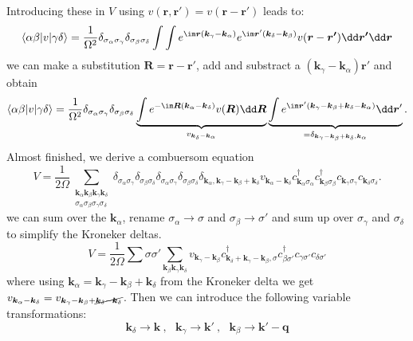 \documentclass[../main.tex]{subfile}
\begin{document}
Introducing these in $V$ using $v(\bm{r}, \bm{r'})= v(\bm{r} - \bm{r'})$ leads to:
\[
    \langle \alpha \beta |v|\gamma\delta\rangle = \frac{1}{\Omega^2} \delta_{\sigma_{\alpha}\sigma_{\gamma}}\delta_{\sigma_{\beta}\sigma_{\delta}} \int \int  e^{\im \bm{r}(\bm{k}_{\gamma}-\bm{k}_{\alpha})}  e^{\im \bm{r}'(\bm{k}_{\delta}-\bm{k}_{\beta})} v(\bm{r} - \bm{r'}) \dd \bm{r'} \dd \bm{r}
\]
we can make a substitution $\bm{R} = \bm{r} - \bm{r}'$, add and substract a $(\bm{k}_{\gamma}-\bm{k}_{\alpha})\bm{r}'$ and obtain
\[
    \langle \alpha \beta |v|\gamma\delta\rangle = \frac{1}{\Omega^2} \delta_{\sigma_{\alpha}\sigma_{\gamma}}\delta_{\sigma_{\beta}\sigma_{\delta}}
     \underbrace{\int e^{-\im\bm{R}(\bm{k}_{\alpha}- \bm{k}_{\delta})} v(\bm{R}) \dd \bm{R}}_{v_{\bm{k}_{\delta}- \bm{k}_{\alpha}}}
    \underbrace{\int e^{\im\bm{r}'\left(\bm{k}_{\gamma}-\bm{k}_{\beta} + \bm{k}_{\delta} -\bm{k}_{\alpha}\right)}\dd \bm{r}'}_{= \delta_{\bm{k}_{\gamma}-\bm{k}_{\beta} + \bm{k}_{\delta} , \bm{k}_{\alpha}}}.
\]
Almost finished, we derive a combuersom equation
\[
    V = \frac{1}{2\Omega} \sum_{\substack{\bm{k}_{\alpha}\bm{k}_{\beta}\bm{k}_{\gamma}\bm{k}_{\delta} \\
         \sigma_{\alpha}\sigma_{\beta}\sigma_{\gamma}\sigma_{\delta}}}
    \delta_{\sigma_{\alpha}\sigma_{\gamma}}\delta_{\sigma_{\beta}\sigma_{\delta}}
    \delta_{\sigma_{\alpha}\sigma_{\gamma}}\delta_{\sigma_{\beta}\sigma_{\delta}}
    \delta_{ \bm{k}_{\alpha}, \bm{k}_{\gamma}-\bm{k}_{\beta} + \bm{k}_{\delta}}
    v_{\bm{k}_{\alpha}- \bm{k}_{\delta}} c_{\bm{k}_\alpha\sigma_{\alpha}}^{\dagger}c_{\bm{k}_\beta\sigma_{\beta}}^{\dagger}c_{\bm{k}_\gamma\sigma_{\gamma}}c_{\bm{k}_\delta\sigma_{\delta}}.
\]
we can sum over the $\bm{k}_{\alpha}$, rename $\sigma_{\alpha} \rightarrow\sigma$ and $\sigma_{\beta} \rightarrow\sigma'$ and sum up over $\sigma_{\gamma}$ and $\sigma_{\delta}$
to simplify the Kroneker deltas.
\[
    V = \frac{1}{2\Omega} \sum{\sigma\sigma'} \sum_{\bm{k}_{\beta}\bm{k}_{\gamma}\bm{k}_{\delta}} v_{\bm{k}_{\gamma}- \bm{k}_{\beta}} c^{\dagger}_{\bm{k}_{\delta}+ \bm{k}_{\gamma}-\bm{k}_{\beta},\sigma}
        c^{\dagger}_{\beta\sigma'} c_{\gamma\sigma'} c_{\delta\sigma'} 
\] 
where using $\bm{k}_{\alpha} = \bm{k}_{\gamma}-\bm{k}_{\beta} + \bm{k}_{\delta}$ from the Kroneker delta we get $v_{\bm{k}_{\alpha}- \bm{k}_{\delta}} = v_{\bm{k}_{\gamma}-\bm{k}_{\beta} + \cancel{\bm{k}_{\delta}-\bm{k}_{\delta}}}$.
Then we can introduce the following variable transformations:
\[
    \bm{k}_{\delta} \rightarrow \bm{k} ~,~~~ \bm{k}_{\gamma} \rightarrow \bm{k}' ~,~~~ \bm{k}_{\beta} \rightarrow \bm{k}' - \bm{q}
\]
\end{document}
